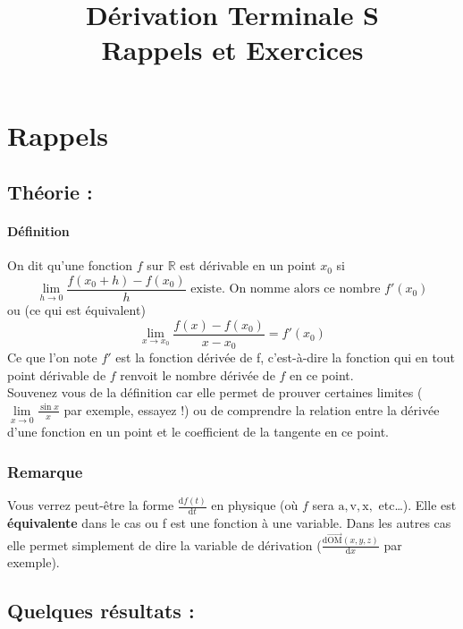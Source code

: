 \documentclass[11pt]{article}
\title{Dérivation Terminale S\\
        \large Rappels et Exercices}
\date{}
\author{}
\newcommand{\R}{\mathbb R}
\begin{document}
    
    \maketitle
    
    \section{Rappels}
        \subsection{Théorie :}
        
        \paragraph{Définition}
        On dit qu'une fonction $f$ sur $\R$ est dérivable en un point $x_0$ si
        \begin{equation}
            \lim\limits_{h \to 0} \frac{f(x_0 + h)-f(x_0)}{h} \text{ existe. On nomme alors ce nombre $f'(x_0)$} 
        \end{equation}
        ou (ce qui est équivalent)
        \begin{equation*}
            \lim\limits_{x \to x_0} \frac{f(x)-f(x_0)}{x-x_0} = f'(x_0)            
        \end{equation*}
        Ce que l'on note $f'$ est la fonction dérivée de f, c'est-à-dire la fonction qui en tout point dérivable de $f$ renvoit le nombre dérivée de $f$ en ce point.\\
        Souvenez vous de la définition car elle permet de prouver certaines limites ($\lim\limits_{x \to 0} \frac{\sin{x}}{x}$ par exemple, essayez !) ou de comprendre la relation entre la dérivée d'une fonction en un point et le coefficient de la tangente en ce point.
        \subsubsection*{Remarque}
        Vous verrez peut-être la forme $\frac{\mathrm{d}f(t)}{\mathrm{d}t}$ en physique (où $f$ sera $\mathrm{a}, \mathrm{v}, \mathrm{x},$ etc\dots). Elle est \textbf{équivalente} dans le cas ou f est une fonction à une variable. Dans les autres cas elle permet simplement de dire la variable de dérivation ($\frac{\mathrm{d}\overrightarrow{\mathrm{OM}}(x,y,z)}{\mathrm{d}x}$ par exemple). 

        \subsection{Quelques résultats :}
\end{document}
